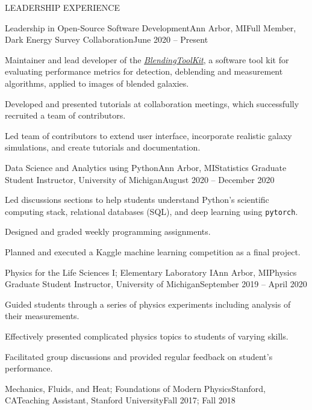 \documentclass{resume} %
\newcommand{\pytorch}[0]{\texttt{pytorch}}
\begin{document}
\begin{rSection}{LEADERSHIP EXPERIENCE} 
\begin{rSubsection}{Leadership in Open-Source Software Development}{Ann Arbor, MI}{Full Member, Dark Energy Survey Collaboration}{June 2020 -- Present}
\item Maintainer and lead developer of the \textit{\href{https://github.com/LSSTDESC/BlendingToolKit}{BlendingToolKit}}, a software tool kit for evaluating performance metrics for detection, deblending and measurement algorithms, applied to images of blended galaxies.

\item Developed and presented tutorials at collaboration meetings, which successfully recruited a team of contributors.

\item Led team of contributors to extend user interface, incorporate realistic galaxy simulations, and create tutorials and documentation.
\end{rSubsection}
%
\begin{rSubsection}{Data Science and Analytics using Python}{Ann Arbor, MI}{Statistics Graduate Student Instructor, University of Michigan}{August 2020 -- December 2020}
%
\item Led discussions sections to help students understand Python's scientific computing stack, relational databases (SQL), and deep learning using \pytorch.
\item Designed and graded weekly programming assignments.
\item Planned and executed a Kaggle machine learning competition as a final project.
%
\end{rSubsection} 
%
\begin{rSubsection}{Physics for the Life Sciences I; Elementary Laboratory I}{Ann Arbor, MI}{Physics Graduate Student Instructor, University of Michigan}{September 2019 -- April 2020}
%
\item Guided students through a series of physics experiments including analysis of their measurements.

\item Effectively presented complicated physics topics to students of varying skills. 

\item Facilitated group discussions and provided regular feedback on student's performance. 
\end{rSubsection} 
%
\begin{rSubsection}{Mechanics, Fluids, and Heat; Foundations of Modern Physics}{Stanford, CA}{Teaching Assistant, Stanford University}{Fall 2017; Fall 2018}


\end{rSubsection}
\end{rSection}
\end{document}
